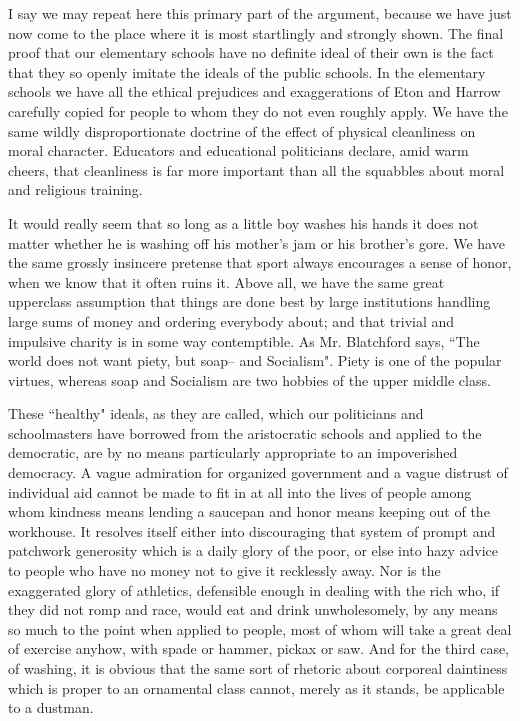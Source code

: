 \documentclass[final,10pt,letterpaper,twocolumn,openany]{book}
\begin{document}
I say we may repeat here this primary part of the argument, because
we have just now come to the place where it is most startlingly and
strongly shown. The final proof that our elementary schools have no
definite ideal of their own is the fact that they so openly imitate the ideals
of the public schools. In the elementary schools we have all the ethical
prejudices and exaggerations of Eton and Harrow carefully copied for
people to whom they do not even roughly apply. We have the same wildly
disproportionate doctrine of the effect of physical cleanliness on moral
character. Educators and educational politicians declare, amid warm
cheers, that cleanliness is far more important than all the squabbles about
moral and religious training. 

It would really seem that so long as a little
boy washes his hands it does not matter whether he is washing off his
mother's jam or his brother's gore. We have the same grossly insincere
pretense that sport always encourages a sense of honor, when we know
that it often ruins it. Above all, we have the same great upperclass
assumption that things are done best by large institutions handling large
sums of money and ordering everybody about; and that trivial and
impulsive charity is in some way contemptible. As Mr. Blatchford says,
``The world does not want piety, but soap-- and Socialism". Piety is one of
the popular virtues, whereas soap and Socialism are two hobbies of the
upper middle class.

These ``healthy" ideals, as they are called, which our politicians and
schoolmasters have borrowed from the aristocratic schools and applied to
the democratic, are by no means particularly appropriate to an
impoverished democracy. A vague admiration for organized government
and a vague distrust of individual aid cannot be made to fit in at all into
the lives of people among whom kindness means lending a saucepan and
honor means keeping out of the workhouse. It resolves itself either into
discouraging that system of prompt and patchwork generosity which is a
daily glory of the poor, or else into hazy advice to people who have no
money not to give it recklessly away. Nor is the exaggerated glory of
athletics, defensible enough in dealing with the rich who, if they did not
romp and race, would eat and drink unwholesomely, by any means so
much to the point when applied to people, most of whom will take a great
deal of exercise anyhow, with spade or hammer, pickax or saw. And for
the third case, of washing, it is obvious that the same sort of rhetoric about
corporeal daintiness which is proper to an ornamental class cannot, merely
as it stands, be applicable to a dustman. 
\end{document}
